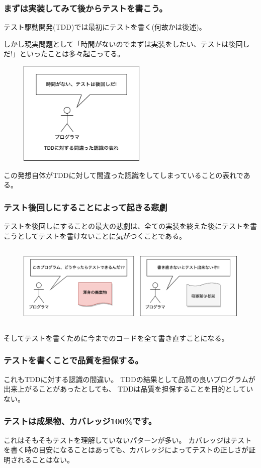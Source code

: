 \documentclass[aspectratio=169]{beamer}
\begin{document}
\begin{frame}\frametitle{まずは実装してみて後からテストを書こう。}
  テスト駆動開発(TDD)では最初にテストを書く(何故かは後述)。

  しかし現実問題として「時間がないのでまずは実装をしたい、テストは後回しだ!」といったことは多々起こってる。
  \begin{figure}
    \includegraphics[height=5cm]{asset/bad_programmer.png}
  \end{figure}
  この発想自体がTDDに対して間違った認識をしてしまっていることの表れである。
\end{frame}

\begin{frame}\frametitle{テスト後回しにすることによって起きる悲劇}
  テストを後回しにすることの最大の悲劇は、全ての実装を終えた後にテストを書こうとしてテストを書けないことに気がつくことである。
  \begin{figure}
    \includegraphics[height=4cm]{asset/gabage_code.png}
  \end{figure}
  そしてテストを書くために今までのコードを全て書き直すことになる。
\end{frame}

\begin{frame}\frametitle{テストを書くことで品質を担保する。}
  これもTDDに対する認識の間違い。
  TDDの結果として品質の良いプログラムが出来上がることがあったとしても、
  TDDは品質を担保することを目的としていない。
\end{frame}

\begin{frame}[fragile]\frametitle{テストは成果物、カバレッジ100\%です。}
  これはそもそもテストを理解していないパターンが多い。
  カバレッジはテストを書く時の目安になることはあっても、カバレッジによってテストの正しさが証明されることはない。
\end{frame}
\end{document}
